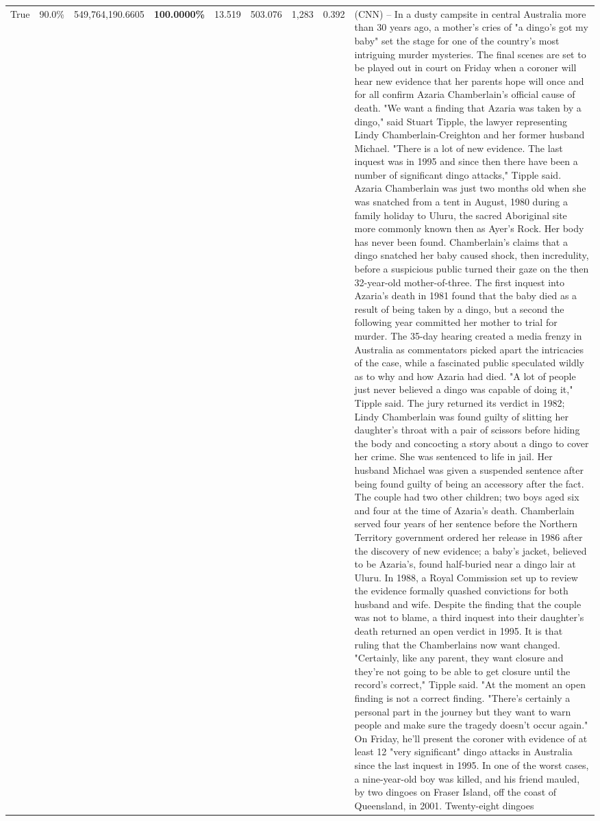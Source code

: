 \begin{table}[H]
\begin{tabular}{lllrlllll}
True & 90.0\% & 549,764,190.6605 & \bfseries \color{red} 100.0000\% & 13.519 & 503.076 & 1,283 & 0.392 & (CNN) -- In a dusty campsite in central Australia more than 30 years ago, a mother's cries of "a dingo's got my baby" set the stage for one of the country's most intriguing murder mysteries. The final scenes are set to be played out in court on Friday when a coroner will hear new evidence that her parents hope will once and for all confirm Azaria Chamberlain's official cause of death. "We want a finding that Azaria was taken by a dingo," said Stuart Tipple, the lawyer representing Lindy Chamberlain-Creighton and her former husband Michael. "There is a lot of new evidence. The last inquest was in 1995 and since then there have been a number of significant dingo attacks," Tipple said. Azaria Chamberlain was just two months old when she was snatched from a tent in August, 1980 during a family holiday to Uluru, the sacred Aboriginal site more commonly known then as Ayer's Rock. Her body has never been found. Chamberlain's claims that a dingo snatched her baby caused shock, then incredulity, before a suspicious public turned their gaze on the then 32-year-old mother-of-three. The first inquest into Azaria's death in 1981 found that the baby died as a result of being taken by a dingo, but a second the following year committed her mother to trial for murder. The 35-day hearing created a media frenzy in Australia as commentators picked apart the intricacies of the case, while a fascinated public speculated wildly as to why and how Azaria had died. "A lot of people just never believed a dingo was capable of doing it," Tipple said. The jury returned its verdict in 1982; Lindy Chamberlain was found guilty of slitting her daughter's throat with a pair of scissors before hiding the body and concocting a story about a dingo to cover her crime. She was sentenced to life in jail. Her husband Michael was given a suspended sentence after being found guilty of being an accessory after the fact. The couple had two other children; two boys aged six and four at the time of Azaria's death. Chamberlain served four years of her sentence before the Northern Territory government ordered her release in 1986 after the discovery of new evidence; a baby's jacket, believed to be Azaria's, found half-buried near a dingo lair at Uluru. In 1988, a Royal Commission set up to review the evidence formally quashed convictions for both husband and wife. Despite the finding that the couple was not to blame, a third inquest into their daughter's death returned an open verdict in 1995. It is that ruling that the Chamberlains now want changed. "Certainly, like any parent, they want closure and they're not going to be able to get closure until the record's correct," Tipple said. "At the moment an open finding is not a correct finding. "There's certainly a personal part in the journey but they want to warn people and make sure the tragedy doesn't occur again." On Friday, he'll present the coroner with evidence of at least 12 "very significant" dingo attacks in Australia since the last inquest in 1995. In one of the worst cases, a nine-year-old boy was killed, and his friend mauled, by two dingoes on Fraser Island, off the coast of Queensland, in 2001. Twenty-eight dingoes 
\end{tabular}
\end{table}
